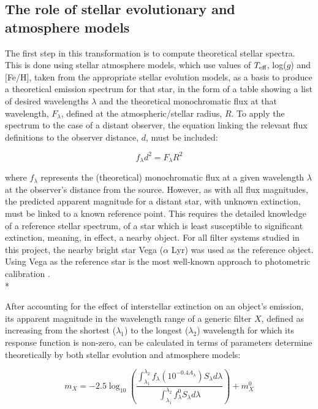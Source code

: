 \documentclass[12pt, a4paper]{report}
\begin{document}
\subsection{The role of stellar evolutionary and atmosphere models}
The first step in this transformation is to compute theoretical stellar spectra. This is done using stellar atmosphere models, which use values of $T_{\textnormal{eff}}$, log($g$) and [Fe/H], taken from the appropriate stellar evolution models, as a basis to produce a theoretical emission spectrum for that star, in the form of a table showing a list of desired wavelengths $\lambda$ and the theoretical monochromatic flux at that wavelength, $F_{\lambda}$, defined at the atmospheric/stellar radius, $R$. To apply the spectrum to the case of a distant observer, the equation linking the relevant flux definitions to the observer distance, $d$, must be included:

\begin{equation}
f_{\lambda}d^{2}=F_{\lambda}R^{2}
\label{flux_dist_rd}
\end{equation}


where $f_{\lambda}$ represents the (theoretical) monochromatic flux at a given wavelength $\lambda$ at the observer's distance from the source. However, as with all flux magnitudes, the predicted apparent magnitude for a distant star, with unknown extinction,  must be linked to a known reference point. This requires the detailed knowledge of a reference stellar spectrum, of a star which is least susceptible to significant extinction, meaning, in effect, a nearby object. For all filter systems studied in this project, the nearby bright star Vega ($\alpha$ Lyr) was used as the reference object. Using Vega as the reference star is the most well-known approach to photometric calibration \citep{2014MNRAS.444..392C}.\\*

After accounting for the effect of interstellar extinction on an object's emission, its apparent magnitude in the wavelength range of a generic filter $X$, defined as increasing from the shortest ($\lambda_{1}$) to the longest ($\lambda_{2}$) wavelength for which its response function is non-zero, can be calculated in terms of parameters determine theoretically by both stellar evolution and atmosphere models:

\begin{equation}
m_{X} = -2.5 \log_{10} \left(\frac{ \int_{\lambda_{1}}^{\lambda_{2}} f_{\lambda} \left( 10^{-0.4 A_{\lambda}} \right) S_{\lambda} d\lambda }{ \int_{\lambda_{1}}^{\lambda_{2}} f_{\lambda}^{0} S_{\lambda} d\lambda }\right) + m_{X}^{0}
\label{app_mag_def}
\end{equation}
\end{document}
